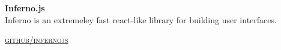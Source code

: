 {\raggedright
  \textbf{Inferno.js}
  \\

  Inferno is an extremeley fast react-like library for building user interfaces.

  \textsc{\small\href{http://github.com/infernojs}{github/infernojs}}
} \\
